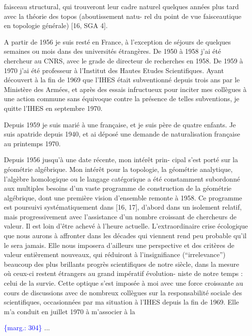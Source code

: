 \documentclass[11pt]{article}
\newcommand{\scanpage}[1]{\par\bigskip\noindent{\small\sffamily[scan #1]}\par}
\newcommand{\mspage}[1]{{\small\sffamily[p.\,#1]}}
\newcommand{\margin}[1]{\textcolor{blue}{\{\textsf{marg.:} #1\}}}
\begin{document}
faisceau structural, qui trouveront leur cadre naturel quelques
années plus tard avec la théorie des topos (aboutissement natu-%
rel du point de vue faisceautique en topologie générale) [16,
SGA 4].

A partir de 1956 je suis resté en France, à l'exception
de séjours de quelques semaines ou mois dans des universités
étrangères. De 1950 à 1958 j'ai été chercheur au CNRS, avec le
grade de directeur de recherches en 1958. De 1959 à 1970 j'ai
été professeur à l'Institut des Hautes Etudes Scientifiques.
Ayant découvert à la fin de 1969 que l'IHES était subventionné
depuis trois ans par le Ministère des Armées, et après des essais
infructueux pour inciter mes collègues à une action commune sans
équivoque contre la présence de telles subventions, je quitte
l'IHES en septembre 1970.

Depuis 1959 je suis marié à une française, et je suis
père de quatre enfants. Je suis apatride depuis 1940, et ai
déposé une demande de naturalisation française au printemps 1970.

Depuis 1956 jusqu'à une date récente, mon intérêt prin-%
cipal s'est porté sur la géométrie algébrique. Mon intérêt pour
la topologie, la géométrie analytique, l'algèbre homologique ou
le langage catégorique a été constamment subordonné aux multiples
besoins d'un vaste programme de construction de la géométrie
algébrique, dont une première vision d'ensemble remonte à 1958.
Ce programme est poursuivi systématiquement dans [16, 17], d'abord
dans un isolement relatif, mais progressivement avec l'assistance
d'un nombre croissant de chercheurs de valeur. Il est loin d'être
achevé à l'heure actuelle. L'extraordinaire crise écologique que
nous aurons à affronter dans les décades qui viennent rend peu
probable qu'il le sera jamais. Elle nous imposera d'ailleurs
une perspective et des critères de valeur entièrement nouveaux,
qui réduiront à l'insignifiance (``irrelevance'') beaucoup des
plus brillants progrès scientifiques de notre siècle, dans la
mesure où ceux-ci restent étrangers au grand impératif évolution-%
niste de notre temps : celui de la survie. Cette optique s'est
imposée à moi avec une force croissante au cours de discussions
avec de nombreux collègues sur la responsabilité sociale des
scientifiques, occasionnées par ma situation à l'IHES depuis la
fin de 1969. Elle m'a conduit en juillet 1970 à m'associer à la

\margin{304} \hfill ...

\clearpage
\scanpage{119/305}
\mspage{-3-}
\end{document}
